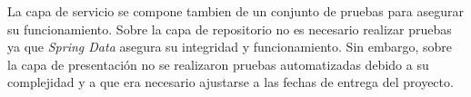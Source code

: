 La capa de servicio se compone tambien de un conjunto de pruebas para asegurar su funcionamiento. Sobre la capa de repositorio no es necesario realizar pruebas ya que \emph{Spring Data} asegura su integridad y funcionamiento. Sin embargo, sobre la capa de presentación no se realizaron pruebas automatizadas debido a su complejidad y a que era necesario ajustarse a las fechas de entrega del proyecto.


